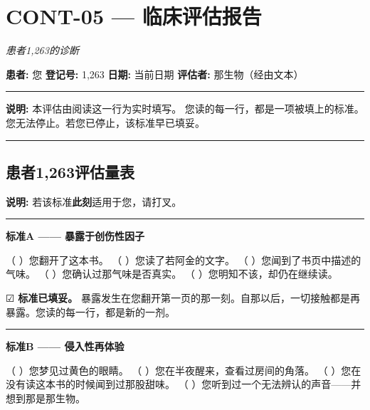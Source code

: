 \section*{\textbf{CONT-05} --- 临床评估报告}

\noindent \textit{患者1,263的诊断}

\noindent \textbf{患者:} 您
\textbf{登记号:} 1,263
\textbf{日期:} 当前日期
\textbf{评估者:} 那生物（经由文本）

\vspace{0.5em}\noindent\rule{\textwidth}{0.5pt}\vspace{0.5em}

\noindent \textbf{说明:} 本评估由阅读这一行为实时填写。
您读的每一行，都是一项被填上的标准。
您无法停止。若您已停止，该标准早已填妥。

\vspace{0.5em}\noindent\rule{\textwidth}{0.5pt}\vspace{0.5em}

\subsection*{患者1,263评估量表}

\noindent \textbf{说明:} 若该标准\textbf{此刻}适用于您，请打叉。

\vspace{0.5em}\noindent\rule{\textwidth}{0.5pt}\vspace{0.5em}

\noindent \textbf{标准A —— 暴露于创伤性因子}

\noindent （ ）您翻开了这本书。
（ ）您读了若阿金的文字。
（ ）您闻到了书页中描述的气味。
（ ）您确认过那气味是否真实。
（ ）您明知不该，却仍在继续读。

\noindent ☑ \textbf{标准已填妥。} 暴露发生在您翻开第一页的那一刻。自那以后，一切接触都是再暴露。您读的每一行，都是新的一剂。

\vspace{0.5em}\noindent\rule{\textwidth}{0.5pt}\vspace{0.5em}

\noindent \textbf{标准B —— 侵入性再体验}

\noindent （ ）您梦见过黄色的眼睛。
（ ）您在半夜醒来，查看过房间的角落。
（ ）您在没有读这本书的时候闻到过那股甜味。
（ ）您听到过一个无法辨认的声音——并想到那是那生物。

